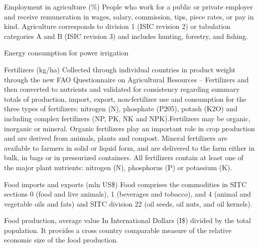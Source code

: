 \begin{MetadataCollection} {}
\begin{metadata}{Employment in agriculture (\%)} {}
People who work for a public or private employer and receive remuneration in wages, salary, commission, tips, piece rates, or pay in kind. Agriculture corresponds to division 1 (ISIC revision 2) or tabulation categories A and B (ISIC revision 3) and includes hunting, forestry, and fishing.
\end{metadata}

\begin{metadata}{Energy consumption for power irrigation} {}
\end{metadata}

\begin{metadata}{Fertilizers (kg/ha)} {}
Collected through individual countries in product weight through the new FAO Questionnaire on Agricultural Resources – Fertilizers and then converted to nutrients and validated for consistency regarding summary totals of production, import, export, non-fertilizer use and consumption for the three types of fertilizers: nitrogen (N), phosphate (P205), potash (K2O) and including complex fertilizers (NP, PK, NK and NPK).Fertilizers may be organic, inorganic or mineral. Organic fertilizers play an important role in crop production and are derived from animals, plants and compost. Mineral fertilizers are available to farmers in solid or liquid form, and are delivered to the farm either in bulk, in bags or in pressurized containers. All fertilizers contain at least one of the major plant nutrients: nitrogen (N), phosphorus (P) or potassium (K).
\end{metadata}

\begin{metadata}{Food imports and exports (mln US\$)} {}
Food comprises the commodities in SITC sections 0 (food and live animals), 1 (beverages and tobacco), and 4 (animal and vegetable oils and fats) and SITC division 22 (oil seeds, oil nuts, and oil kernels).
\end{metadata}

\begin{metadata}{Food production, average value} {}
 In International Dollars (I\$) divided by the total population. It provides a cross country comparable measure of the relative economic size of the food production.
\end{metadata}


\end{MetadataCollection}
